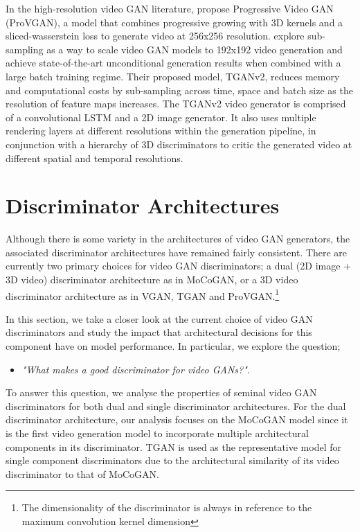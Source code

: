 \documentclass[a4paper,fleqn]{cas-sc}
\begin{document}
In the high-resolution video GAN literature, \citet{AcharyaHPG2018towards} propose Progressive Video GAN (ProVGAN), a model that combines progressive growing with 3D kernels and a sliced-wasserstein loss to generate video at 256x256 resolution. \citet{saito2018tganv2} explore sub-sampling as a way to scale video GAN models to 192x192 video generation and achieve state-of-the-art unconditional generation results when combined with a large batch training regime. Their proposed model, TGANv2, reduces memory and computational costs by sub-sampling across time, space and batch size as the resolution of feature maps increases. The TGANv2 video generator is comprised of a convolutional LSTM and a 2D image generator. It also uses multiple rendering layers at different resolutions within the generation pipeline, in conjunction with a hierarchy of 3D discriminators to critic the generated video at different spatial and temporal resolutions.

\section{Discriminator Architectures}
\label{sec:disc_arch}
Although there is some variety in the architectures of video GAN generators, the associated discriminator architectures have remained fairly consistent. There are currently two primary choices for video GAN discriminators; a dual (2D image + 3D video) discriminator architecture as in MoCoGAN, or a 3D video discriminator architecture as in VGAN, TGAN and ProVGAN.\footnote{The dimensionality of the discriminator is always in reference to the maximum convolution kernel dimension}

In this section, we take a closer look at the current choice of video GAN discriminators and study the impact that architectural decisions for this component have on model performance. In particular, we explore the question;

\begin{itemize}
    \item \textit{"What makes a good discriminator for video GANs?"}.
\end{itemize}


To answer this question, we analyse the properties of seminal video GAN discriminators for both dual and single discriminator architectures. For the dual discriminator architecture, our analysis focuses on the MoCoGAN model since it is the first video generation model to incorporate multiple architectural components in its discriminator. TGAN is used as the representative model for single component discriminators due to the  architectural similarity of its video discriminator to that of MoCoGAN.
\end{document}
